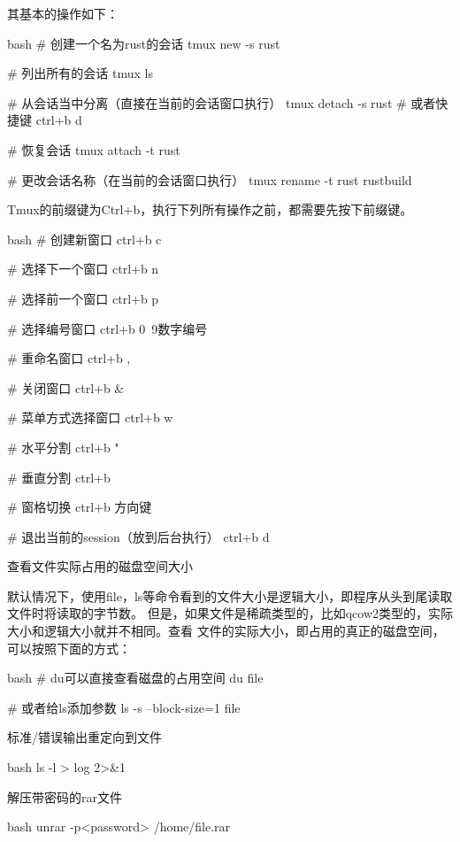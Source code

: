 \begin{outline}[enumerate]
其基本的操作如下：
\begin{code-block}{bash}
# 创建一个名为rust的会话
tmux new -s rust

# 列出所有的会话
tmux ls

# 从会话当中分离（直接在当前的会话窗口执行）
tmux detach -s rust
# 或者快捷键 ctrl+b d

# 恢复会话
tmux attach -t rust

# 更改会话名称（在当前的会话窗口执行）
tmux rename -t rust rustbuild
\end{code-block}

Tmux的前缀键为Ctrl+b，执行下列所有操作之前，都需要先按下前缀键。
\begin{code-block}{bash}
# 创建新窗口
ctrl+b c

# 选择下一个窗口
ctrl+b n

# 选择前一个窗口
ctrl+b p

# 选择编号窗口
ctrl+b 0~9数字编号

# 重命名窗口
ctrl+b ,

# 关闭窗口
ctrl+b &

# 菜单方式选择窗口
ctrl+b w

# 水平分割
ctrl+b "

# 垂直分割
ctrl+b %

# 窗格切换
ctrl+b 方向键

# 退出当前的session（放到后台执行）
ctrl+b d
\end{code-block}

\1 查看文件实际占用的磁盘空间大小

默认情况下，使用file，ls等命令看到的文件大小是逻辑大小，即程序从头到尾读取文件时将读取的字节数。
但是，如果文件是稀疏类型的，比如qcow2类型的，实际大小和逻辑大小就并不相同。查看
文件的实际大小，即占用的真正的磁盘空间，可以按照下面的方式：
\begin{code-block}{bash}
# du可以直接查看磁盘的占用空间
du file

# 或者给ls添加参数
ls -s --block-size=1 file
\end{code-block}

\1 标准/错误输出重定向到文件

\begin{code-block}{bash}
ls -l > log 2>&1
\end{code-block}

\1 解压带密码的rar文件

\begin{code-block}{bash}
unrar -p<password> /home/file.rar
\end{code-block}


\end{outline}
